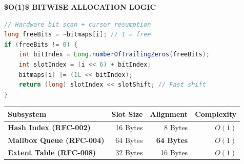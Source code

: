 \documentclass[12pt]{article}
\begin{document}
\begin{minipage}[t]{0.48\textwidth}
    \vspace{0pt}
    {\fontsize{9.5}{11}\selectfont\color{shidenmuted}\textbf{\$O(1)\$ BITWISE ALLOCATION LOGIC}\par}
    \vspace{3.5mm}
    
    \begin{lstlisting}[language=Java]
// Hardware bit scan + cursor resumption
long freeBits = ~bitmaps[i]; // 1 = free
if (freeBits != 0) {
    int bitIndex = Long.numberOfTrailingZeros(freeBits);
    int slotIndex = (i << 6) + bitIndex;
    bitmaps[i] |= (1L << bitIndex);
    return (long) slotIndex << slotShift; // Fast shift
}
    \end{lstlisting}
    
    \vspace{3.5mm}
    \fontsize{9.5}{12.5}\selectfont
    \noindent
    \begin{tabular}{lrrr}
    \toprule
    \textbf{Subsystem} & \textbf{Slot Size} & \textbf{Alignment} & \textbf{Complexity} \\
    \midrule
    \textbf{Hash Index (RFC-002)} & 16 Bytes & 8 Bytes & $O(1)$ \\
    \textbf{Mailbox Queue (RFC-004)} & 64 Bytes & \color{shidensuccess}\textbf{64 Bytes} & $O(1)$ \\
    \textbf{Extent Table (RFC-008)} & 32 Bytes & 16 Bytes & $O(1)$ \\
    \bottomrule
    \end{tabular}
\end{minipage}
\clearpage
\end{document}
